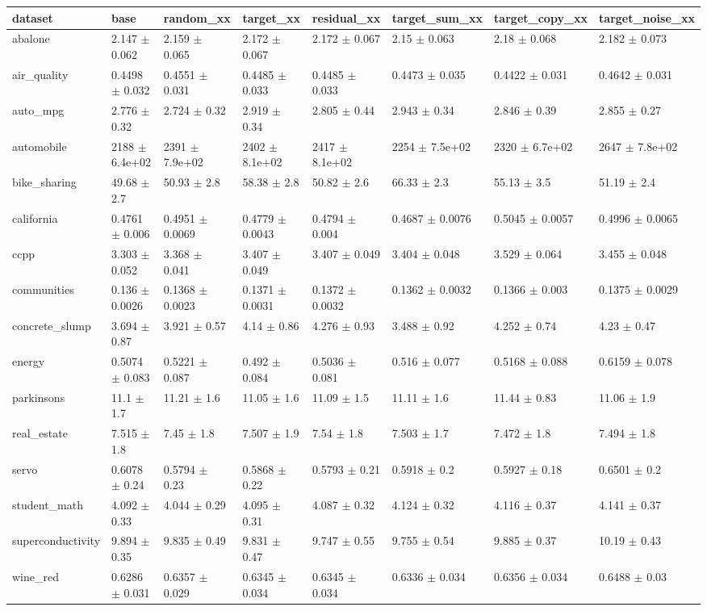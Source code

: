 \begin{tabular}{llllllll}
\toprule
dataset & base & random\_xx & target\_xx & residual\_xx & target\_sum\_xx & target\_copy\_xx & target\_noise\_xx \\
\midrule
abalone & 2.147 $\pm$ 0.062 & 2.159 $\pm$ 0.065 & 2.172 $\pm$ 0.067 & 2.172 $\pm$ 0.067 & 2.15 $\pm$ 0.063 & 2.18 $\pm$ 0.068 & 2.182 $\pm$ 0.073 \\
air\_quality & 0.4498 $\pm$ 0.032 & 0.4551 $\pm$ 0.031 & 0.4485 $\pm$ 0.033 & 0.4485 $\pm$ 0.033 & 0.4473 $\pm$ 0.035 & 0.4422 $\pm$ 0.031 & 0.4642 $\pm$ 0.031 \\
auto\_mpg & 2.776 $\pm$ 0.32 & 2.724 $\pm$ 0.32 & 2.919 $\pm$ 0.34 & 2.805 $\pm$ 0.44 & 2.943 $\pm$ 0.34 & 2.846 $\pm$ 0.39 & 2.855 $\pm$ 0.27 \\
automobile & 2188 $\pm$ 6.4e+02 & 2391 $\pm$ 7.9e+02 & 2402 $\pm$ 8.1e+02 & 2417 $\pm$ 8.1e+02 & 2254 $\pm$ 7.5e+02 & 2320 $\pm$ 6.7e+02 & 2647 $\pm$ 7.8e+02 \\
bike\_sharing & 49.68 $\pm$ 2.7 & 50.93 $\pm$ 2.8 & 58.38 $\pm$ 2.8 & 50.82 $\pm$ 2.6 & 66.33 $\pm$ 2.3 & 55.13 $\pm$ 3.5 & 51.19 $\pm$ 2.4 \\
california & 0.4761 $\pm$ 0.006 & 0.4951 $\pm$ 0.0069 & 0.4779 $\pm$ 0.0043 & 0.4794 $\pm$ 0.004 & 0.4687 $\pm$ 0.0076 & 0.5045 $\pm$ 0.0057 & 0.4996 $\pm$ 0.0065 \\
ccpp & 3.303 $\pm$ 0.052 & 3.368 $\pm$ 0.041 & 3.407 $\pm$ 0.049 & 3.407 $\pm$ 0.049 & 3.404 $\pm$ 0.048 & 3.529 $\pm$ 0.064 & 3.455 $\pm$ 0.048 \\
communities & 0.136 $\pm$ 0.0026 & 0.1368 $\pm$ 0.0023 & 0.1371 $\pm$ 0.0031 & 0.1372 $\pm$ 0.0032 & 0.1362 $\pm$ 0.0032 & 0.1366 $\pm$ 0.003 & 0.1375 $\pm$ 0.0029 \\
concrete\_slump & 3.694 $\pm$ 0.87 & 3.921 $\pm$ 0.57 & 4.14 $\pm$ 0.86 & 4.276 $\pm$ 0.93 & 3.488 $\pm$ 0.92 & 4.252 $\pm$ 0.74 & 4.23 $\pm$ 0.47 \\
energy & 0.5074 $\pm$ 0.083 & 0.5221 $\pm$ 0.087 & 0.492 $\pm$ 0.084 & 0.5036 $\pm$ 0.081 & 0.516 $\pm$ 0.077 & 0.5168 $\pm$ 0.088 & 0.6159 $\pm$ 0.078 \\
parkinsons & 11.1 $\pm$ 1.7 & 11.21 $\pm$ 1.6 & 11.05 $\pm$ 1.6 & 11.09 $\pm$ 1.5 & 11.11 $\pm$ 1.6 & 11.44 $\pm$ 0.83 & 11.06 $\pm$ 1.9 \\
real\_estate & 7.515 $\pm$ 1.8 & 7.45 $\pm$ 1.8 & 7.507 $\pm$ 1.9 & 7.54 $\pm$ 1.8 & 7.503 $\pm$ 1.7 & 7.472 $\pm$ 1.8 & 7.494 $\pm$ 1.8 \\
servo & 0.6078 $\pm$ 0.24 & 0.5794 $\pm$ 0.23 & 0.5868 $\pm$ 0.22 & 0.5793 $\pm$ 0.21 & 0.5918 $\pm$ 0.2 & 0.5927 $\pm$ 0.18 & 0.6501 $\pm$ 0.2 \\
student\_math & 4.092 $\pm$ 0.33 & 4.044 $\pm$ 0.29 & 4.095 $\pm$ 0.31 & 4.087 $\pm$ 0.32 & 4.124 $\pm$ 0.32 & 4.116 $\pm$ 0.37 & 4.141 $\pm$ 0.37 \\
superconductivity & 9.894 $\pm$ 0.35 & 9.835 $\pm$ 0.49 & 9.831 $\pm$ 0.47 & 9.747 $\pm$ 0.55 & 9.755 $\pm$ 0.54 & 9.885 $\pm$ 0.37 & 10.19 $\pm$ 0.43 \\
wine\_red & 0.6286 $\pm$ 0.031 & 0.6357 $\pm$ 0.029 & 0.6345 $\pm$ 0.034 & 0.6345 $\pm$ 0.034 & 0.6336 $\pm$ 0.034 & 0.6356 $\pm$ 0.034 & 0.6488 $\pm$ 0.03 \\
\bottomrule
\end{tabular}
